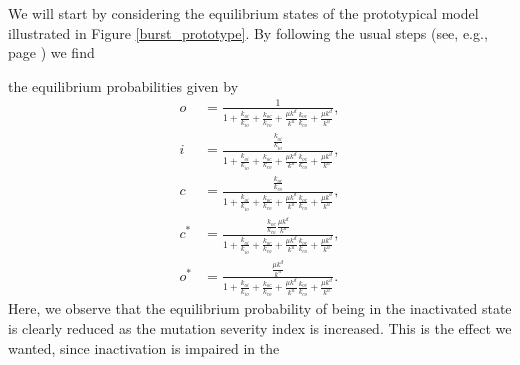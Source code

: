 We will start by considering the equilibrium states of the prototypical
model illustrated in Figure \ref{burst_prototype}. By following the usual steps
(see, e.g., page \pageref{9001}) we find
\begin{comment}
The equilibrium solutions are characterized by
the system of equations%
\begin{align}
k_{io}i  &  =k_{oi}o,\text{ }k_{ci}c=k_{ic}i,\text{ }k_{co}c=k_{oc}o,\\
\mu k^{d}c  &  =k^{u}c^{\ast},\text{ }\mu k^{d}o=k^{u}o^{\ast}.
\end{align}
As usual, all variables can be expressed in terms of the open probability,%
\begin{equation}
i=\frac{k_{oi}}{k_{io}}o,\text{ }c=\frac{k_{oc}}{k_{co}}o,\text{ }c^{\ast
}=\frac{\mu k^{d}}{k^{u}}\frac{k_{oc}}{k_{co}}o,\text{ }o^{\ast}=\frac{\mu
k^{d}}{k^{u}}o,
\end{equation}
and, since $o+i+c+c^{\ast}+o^{\ast}=1,$ we have%
\begin{equation}
\left(  1+\frac{k_{oi}}{k_{io}}+\frac{k_{oc}}{k_{co}}+\frac{\mu k^{d}}{k^{u}%
}\frac{k_{oc}}{k_{co}}+\frac{\mu k^{d}}{k^{u}}\right)  o=1
\end{equation}
and therefore
\end{comment}
 the equilibrium probabilities given by%
\begin{align}
o  &  =\frac{1}{1+\frac{k_{oi}}{k_{io}}+\frac{k_{oc}}{k_{co}}+\frac{\mu k^{d}%
}{k^{u}}\frac{k_{oc}}{k_{co}}+\frac{\mu k^{d}}{k^{u}}},\\
i  &  =\frac{\frac{k_{oi}}{k_{io}}}{1+\frac{k_{oi}}{k_{io}}+\frac{k_{oc}%
}{k_{co}}+\frac{\mu k^{d}}{k^{u}}\frac{k_{oc}}{k_{co}}+\frac{\mu k^{d}}{k^{u}%
}},\\
c  &  =\frac{\frac{k_{oc}}{k_{co}}}{1+\frac{k_{oi}}{k_{io}}+\frac{k_{oc}%
}{k_{co}}+\frac{\mu k^{d}}{k^{u}}\frac{k_{oc}}{k_{co}}+\frac{\mu k^{d}}{k^{u}%
}},\\
c^{\ast}  &  =\frac{\frac{k_{oc}}{k_{co}}\frac{\mu k^{d}}{k^{u}}}%
{1+\frac{k_{oi}}{k_{io}}+\frac{k_{oc}}{k_{co}}+\frac{\mu k^{d}}{k^{u}}%
\frac{k_{oc}}{k_{co}}+\frac{\mu k^{d}}{k^{u}}},\\
o^{\ast}  &  =\frac{\frac{\mu k^{d}}{k^{u}}}{1+\frac{k_{oi}}{k_{io}}%
+\frac{k_{oc}}{k_{co}}+\frac{\mu k^{d}}{k^{u}}\frac{k_{oc}}{k_{co}}+\frac{\mu
k^{d}}{k^{u}}}.
\end{align}
Here, we observe that the equilibrium probability of being in the inactivated
state is clearly reduced as the mutation severity index is increased. This is
the effect we wanted, since inactivation is impaired in the

